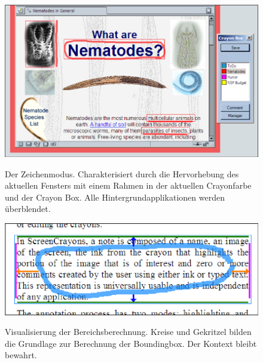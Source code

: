 \begin{figure}
        {\includegraphics[width=\linewidth]{gfx/olsenHighlighting}}
		\caption[Crayon Highlighting \newline \citep{Olsen:2004}]{Der Zeichenmodus. Charakterisiert durch die Hervorhebung des aktuellen Fensters mit einem Rahmen in der aktuellen Crayonfarbe und der Crayon Box. Alle Hintergrundapplikationen werden überblendet.}\label{fig:olsenHighlighting}
\end{figure}

\begin{figure}
        {\includegraphics[width=\linewidth]{gfx/olsenRegionFinding}}
		\caption[Finding Regions for Circles/Scribbles \newline \citep{Olsen:2004}]{Visualisierung der Bereichsberechnung. Kreise und Gekritzel bilden die Grundlage zur Berechnung der Boundingbox. Der Kontext bleibt bewahrt.}\label{fig:olsenRegionFinding}
\end{figure}

